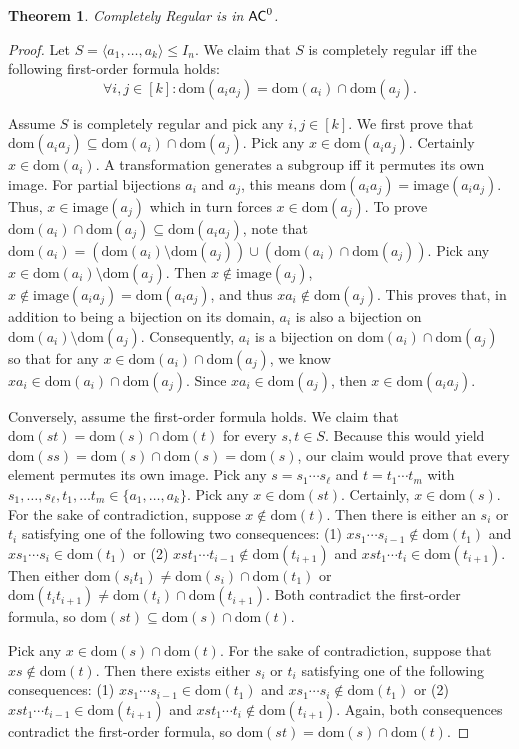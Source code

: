\documentclass{amsart}
\newcommand{\dom}{\mathrm{dom}}
\newcommand{\image}{\mathrm{image}}
\newcommand{\AC}{\ensuremath\mathsf{AC}}
\newtheorem{theorem}{Theorem}[section]
\theoremstyle{remark}
\numberwithin{equation}{section}
\begin{document}
\begin{theorem} \label{thm:ComReg}
Completely Regular is in $\AC^0$.
\end{theorem}
\begin{proof}
Let $S = \langle a_1,\dots,a_k \rangle \leq I_n$. We claim that $S$ is completely regular iff the following first-order formula holds:
\[\forall i,j \in [k] : \dom(a_ia_j) = \dom(a_i) \cap \dom(a_j).\]

Assume $S$ is completely regular and pick any $i,j \in [k]$. We first prove that $\dom(a_ia_j) \subseteq \dom(a_i) \cap \dom(a_j)$. Pick any $x \in \dom(a_ia_j)$. Certainly $x \in \dom(a_i)$. A transformation generates a subgroup iff it permutes its own image. For partial bijections $a_i$ and $a_j$, this means $\dom(a_ia_j) = \image(a_ia_j)$. Thus, $x \in \image(a_j)$ which in turn forces $x \in \dom(a_j)$. To prove $\dom(a_i) \cap \dom(a_j) \subseteq \dom(a_ia_j)$, note that $\dom(a_i) = (\dom(a_i) \setminus \dom(a_j)) \cup (\dom(a_i) \cap \dom(a_j))$. Pick any $x \in \dom(a_i) \setminus \dom(a_j)$. Then $x \not \in \image(a_j)$, $x \not \in \image(a_ia_j) = \dom(a_ia_j)$, and thus $xa_i \not \in \dom(a_j)$. This proves that, in addition to being a bijection on its domain, $a_i$ is also a bijection on $\dom(a_i) \setminus \dom(a_j)$. Consequently, $a_i$ is a bijection on $\dom(a_i) \cap \dom(a_j)$ so that for any $x \in \dom(a_i) \cap \dom(a_j)$, we know $xa_i \in \dom(a_i) \cap \dom(a_j)$. Since $xa_i \in \dom(a_j)$, then $x \in \dom(a_ia_j)$.

Conversely, assume the first-order formula holds. We claim that $\dom(st) = \dom(s) \cap \dom(t)$ for every $s,t \in S$. Because this would yield $\dom(ss) = \dom(s) \cap \dom(s) = \dom(s)$, our claim would prove that every element permutes its own image. Pick any $s = s_1 \cdots s_\ell$ and $t = t_1 \cdots t_m$ with $s_1,\dots,s_\ell,t_1,\dots t_m \in \{a_1,\dots,a_k\}$. Pick any $x \in \dom(st)$. Certainly, $x \in \dom(s)$. For the sake of contradiction, suppose $x \not \in \dom(t)$. Then there is either an $s_i$ or $t_i$ satisfying one of the following two consequences: (1) $xs_1 \cdots s_{i-1} \not \in \dom(t_1)$ and $xs_1 \cdots s_i \in \dom(t_1)$ or (2) $xs t_1 \cdots t_{i-1} \not \in \dom(t_{i+1})$ and $xs t_1 \cdots t_i \in \dom(t_{i+1})$. Then either $\dom(s_it_1) \neq \dom(s_i) \cap \dom(t_1)$ or $\dom(t_it_{i+1}) \neq \dom(t_i) \cap \dom(t_{i+1})$. Both contradict the first-order formula, so $\dom(st) \subseteq \dom(s) \cap \dom(t)$.

Pick any $x \in \dom(s) \cap \dom(t)$. For the sake of contradiction, suppose that $xs \not \in \dom(t)$. Then there exists either $s_i$ or $t_i$ satisfying one of the following consequences: (1) $xs_1 \cdots s_{i-1} \in \dom(t_1)$ and $xs_1 \cdots s_i \not \in \dom(t_1)$ or (2) $xst_1 \cdots t_{i-1} \in \dom(t_{i+1})$ and $xst_1 \cdots t_i \not \in \dom(t_{i+1})$. Again, both consequences contradict the first-order formula, so $\dom(st) = \dom(s) \cap \dom(t)$.
\end{proof}
\end{document}
